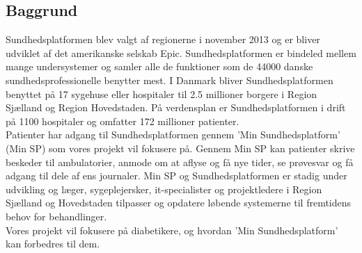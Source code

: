 \subsection{Baggrund}
Sundhedsplatformen blev valgt af regionerne i november 2013 og er bliver udviklet af det amerikanske selskab Epic. Sundhedsplatformen er bindeled mellem mange undersystemer og samler alle de funktioner som de 44000 danske sundhedsprofessionelle benytter mest. I Danmark bliver Sundhedsplatformen benyttet på 17 sygehuse eller hospitaler til 2.5 millioner borgere i Region Sjælland og Region Hovedstaden. På verdensplan er Sundhedsplatformen i drift på 1100 hospitaler og omfatter 172 millioner patienter.\\
Patienter har adgang til Sundhedsplatformen gennem 'Min Sundhedsplatform' (Min SP) som vores projekt vil fokusere på. Gennem Min SP kan patienter skrive beskeder til ambulatorier, anmode om at aflyse og få nye tider, se prøvesvar og få adgang til dele af ens journaler. Min SP og Sundhedsplatformen er stadig under udvikling og læger, sygeplejersker, it-specialister og projektledere i Region Sjælland og Hovedstaden tilpasser og opdatere løbende systemerne til fremtidens behov for behandlinger.\\
Vores projekt vil fokusere på diabetikere, og hvordan 'Min Sundhedsplatform' kan forbedres til dem.